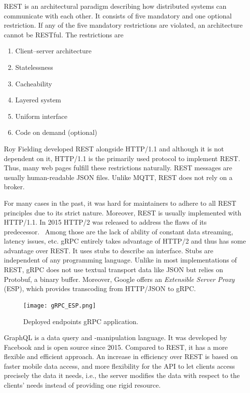 REST is an architectural paradigm describing how distributed systems can communicate with each other. It consists of five mandatory and one optional restriction. If any of the five mandatory restrictions are violated, an architecture cannot be RESTful. The restrictions are 
\begin{enumerate}
    \item Client–server architecture
    \item Statelessness
    \item Cacheability
    \item Layered system
    \item Uniform interface
    \item Code on demand (optional)
\end{enumerate}
Roy Fielding developed REST alongside HTTP/1.1 and although it is not dependent on it, HTTP/1.1 is the primarily used protocol to implement REST. Thus, many web pages fulfill these restrictions naturally. REST messages are usually human-readable JSON files. Unlike MQTT, REST does not rely on a broker.~\cite{Fielding2000ArchitecturalArchitectures} 

For many cases in the past, it was hard for maintainers to adhere to all REST principles due to its strict nature. Moreover, REST is usually implemented with HTTP/1.1. In 2015 HTTP/2 was released to address the flaws of its predecessor.~\cite{Sayfan2018REST2018} Among those are the lack of ability of constant data streaming, latency issues, etc. gRPC entirely takes advantage of HTTP/2 and thus has some advantage over REST. It uses stubs to describe an interface. Stubs are independent of any programming language. Unlike in most implementations of REST, gRPC does not use textual transport data like JSON but relies on Protobuf, a binary buffer. Moreover, Google offers an \textit{Extensible Server Proxy} (ESP), which provides transcoding from HTTP/JSON to gRPC.~\cite{N.A.2017Grpc-gateway.2018, Google-Cloud-Documentation2018Cloud2018} 

\begin{figure}[ht]
	\centering
  \texttt{[image: gRPC\_ESP.png]}
	\caption[Deployed endpoints gRPC application]{Deployed endpoints gRPC application.~\cite{Google-Cloud-Documentation2018Cloud2018}}
	\label{ESP}
\end{figure}

GraphQL is a data query and -manipulation language. It was developed by Facebook and is open source since 2015. Compared to REST, it has a more flexible and efficient approach. An increase in efficiency over REST is based on faster mobile data access, and more flexibility for the API to let clients access precisely the data it needs,  i.e., the server modifies the data with respect to the clients' needs instead of providing one rigid resource.~\cite{GraphQL-Documentation2018Basics2018} 


